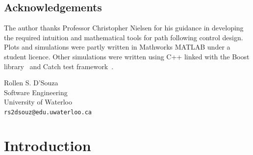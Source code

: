 
%


\maketitle

\frontmatter
\section*{Acknowledgements}
The author thanks Professor Christopher Nielsen for his guidance in developing the required intuition and mathematical tools for path following control design. Plots and simulations were partly written in Mathworks MATLAB under a student licence. Other simulations were written using C++ linked with the Boost library~\cite{boost} and Catch test framework~\cite{catch}.

\begin{flushright}
Rollen S. D'Souza\\
Software Engineering\\
University of Waterloo\\
\texttt{rs2dsouz@edu.uwaterloo.ca}
\end{flushright}

\tableofcontents

\printnomenclature[3cm]
\listoffigures
\listoftables


\mainmatter
\pagestyle{fancy}
\renewcommand{\sectionmark}[1]{\markright{\thesection.\ #1}}

\chapter{Introduction}


